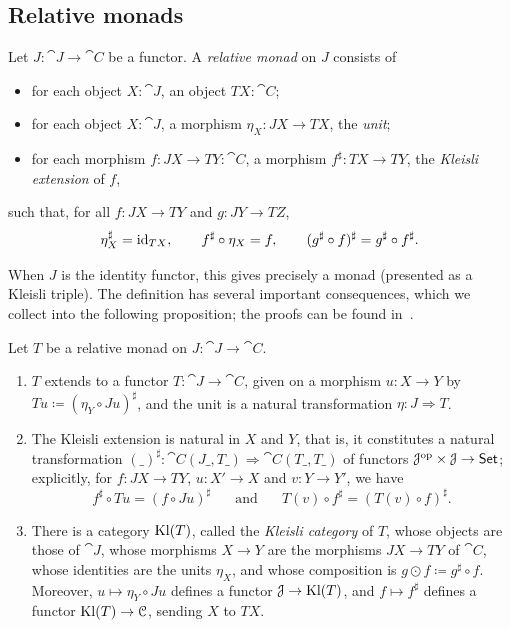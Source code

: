 \subsection{Relative monads}

\begin{definition}
    Let $J : \cat{J} \to \cat{C}$ be a functor. A \emph{relative monad} on $J$ consists of
    \begin{itemize}
        \item for each object $X : \cat{J}$, an object $TX : \cat{C}$;
        \item for each object $X : \cat{J}$, a morphism $\eta_X : JX \to TX$, the \emph{unit};
        \item for each morphism $f : JX \to TY : \cat{C}$, a morphism $f^\sharp : TX \to TY$, the \emph{Kleisli extension} of $f$,
    \end{itemize}
    such that, for all $f : JX \to TY$ and $g : JY \to TZ$,
    \[
    \eta_X^\sharp = \mathrm{id}_{TX}, \qquad
    f^\sharp \circ \eta_X = f, \qquad
    (g^\sharp \circ f)^\sharp = g^\sharp \circ f^\sharp.
    \]
\end{definition}

When $J$ is the identity functor, this gives precisely a monad (presented as a Kleisli triple). The definition has several important consequences, which we collect into the following proposition; the proofs can be found in~\cite[\S\S2.1 and 2.3]{AltenkirchChapmanUustalu2015}.


\begin{proposition}
    Let $T$ be a relative monad on $J : \cat{J} \to \cat{C}$.
    \begin{enumerate}
        \item $T$ extends to a functor $T : \cat{J} \to \cat{C}$, given on a morphism $u : X \to Y$ by $Tu \coloneqq (\eta_Y \circ Ju)^\sharp$, and the unit is a natural transformation $\eta : J \Rightarrow T$.
        \item The Kleisli extension is natural in $X$ and $Y$, that is, it constitutes a natural transformation $(\_)^\sharp : \cat{C}(J\_, T\_) \Rightarrow \cat{C}(T\_, T\_)$ of functors $\mathcal{J}^{\mathrm{op}} \times \mathcal{J} \to \mathsf{Set}$; explicitly, for $f : JX \to TY$, $u : X' \to X$ and $v : Y \to Y'$, we have
        \[
        f^\sharp \circ Tu = (f \circ Ju)^\sharp \;\;\;\;\;\text{ and }\;\;\;\;\; T(v) \circ f^\sharp = (T(v) \circ f)^\sharp.
        \]
        \item There is a category $\mathrm{Kl}(T)$, called the \emph{Kleisli category} of $T$, whose objects are those of $\cat{J}$, whose morphisms $X \to Y$ are the morphisms $JX \to TY$ of $\cat{C}$, whose identities are the units $\eta_X$, and whose composition is $g \odot f \coloneqq g^\sharp \circ f$. Moreover, $u \mapsto \eta_Y \circ Ju$ defines a functor $\mathcal{J} \to \mathrm{Kl}(T)$, and $f \mapsto f^\sharp$ defines a functor $\mathrm{Kl}(T) \to \mathcal{C}$, sending $X$ to $TX$.
    \end{enumerate}
\end{proposition}

